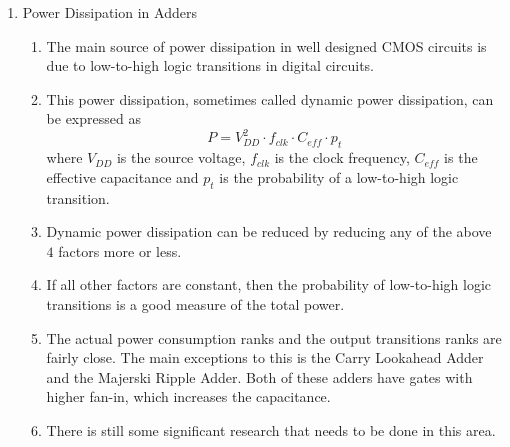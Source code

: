 \documentclass[times, twocolumn, 10pt]{article}
\begin{document}
\begin{enumerate}
\item{Power Dissipation in Adders}
  \begin{enumerate}
  \item The main source of power dissipation in well designed CMOS circuits
    is due to low-to-high logic transitions in digital circuits. 
  \item This power dissipation, sometimes called dynamic power
    dissipation, can be expressed as
    \[	P = V_{DD}^{2} \cdot f_{clk} \cdot C_{eff} \cdot p_{t} \]
    where $V_{DD}$ is the source voltage, $f_{clk}$ is the clock frequency, 
    $C_{eff}$ is the effective capacitance and $p_{t}$ is the probability
    of a low-to-high logic transition. 
  \item Dynamic power dissipation can be
    reduced by reducing any of the above $4$ factors more or less. 
  \item If all other factors are constant, then the probability of low-to-high
    logic transitions is a good measure of the total power.     
  \item The actual power consumption ranks and the output transitions ranks are 
    fairly close. The main exceptions to this is the Carry Lookahead Adder and
    the Majerski Ripple Adder. Both of these adders have gates with 
    higher fan-in, which increases the capacitance.
  \item There is still some significant research that needs to be done in this area.    
  \end{enumerate}
\end{enumerate}
\end{document}
